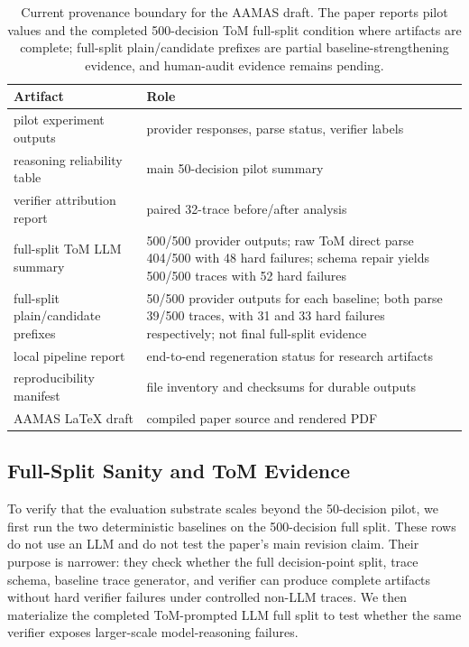 \documentclass[sigconf,anonymous,review]{acmart}
\begin{document}
\begin{table}[t]
\centering
\caption{Current provenance boundary for the AAMAS draft. The paper reports pilot values and the completed 500-decision ToM full-split condition where artifacts are complete; full-split plain/candidate prefixes are partial baseline-strengthening evidence, and human-audit evidence remains pending.}
\label{tab:provenance}
\scriptsize
\begin{tabularx}{\columnwidth}{lX}
\toprule
Artifact & Role \\
\midrule
pilot experiment outputs & provider responses, parse status, verifier labels \\
reasoning reliability table & main 50-decision pilot summary \\
verifier attribution report & paired 32-trace before/after analysis \\
full-split ToM LLM summary & 500/500 provider outputs; raw ToM direct parse 404/500 with 48 hard failures; schema repair yields 500/500 traces with 52 hard failures \\
full-split plain/candidate prefixes & 50/500 provider outputs for each baseline; both parse 39/500 traces, with 31 and 33 hard failures respectively; not final full-split evidence \\
local pipeline report & end-to-end regeneration status for research artifacts \\
reproducibility manifest & file inventory and checksums for durable outputs \\
AAMAS LaTeX draft & compiled paper source and rendered PDF \\
\bottomrule
\end{tabularx}
\end{table}

\subsection{Full-Split Sanity and ToM Evidence}

To verify that the evaluation substrate scales beyond the 50-decision pilot, we first run the two deterministic baselines on the 500-decision full split. These rows do not use an LLM and do not test the paper's main revision claim. Their purpose is narrower: they check whether the full decision-point split, trace schema, baseline trace generator, and verifier can produce complete artifacts without hard verifier failures under controlled non-LLM traces. We then materialize the completed ToM-prompted LLM full split to test whether the same verifier exposes larger-scale model-reasoning failures.
\end{document}
